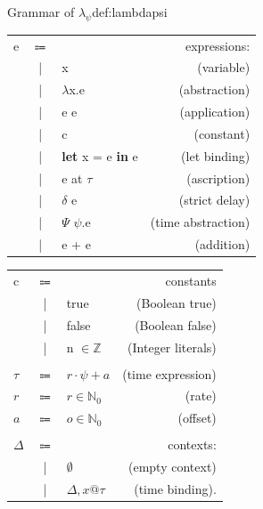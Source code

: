 \begin{definitiontitled}{Grammar of $\lambda_\psi$}{def:lambdapsi}
\begin{changemargin}{-0.5cm}{0cm}
\begin{minipage}[b]{0.50\linewidth}
\begin{tabular}{lclr}
e       & $\Coloneqq$ &                 & expressions: \\
        & |    & x                     & (variable) \\
        & |    & $\lambda$x.e          & (abstraction) \\
        & |    & e e                   & (application) \\
        & |    & c                     & (constant) \\
        & |    & \textbf{let} x = e \textbf{in} e        & (let binding) \\
        & |    & e at $\tau$           & (ascription) \\
        & |    & $\delta$ e              & (strict delay) \\
        & |    & $\Psi$ $\psi$.e          & (time abstraction) \\
        & |    & e + e                  & (addition) \\
\end{tabular}
\end{minipage}
\begin{minipage}[b]{0.40\linewidth}
\begin{tabular}{lclr}
c       & $\Coloneqq$ &                & constants \\
        & |    & true                  & (Boolean true) \\
        & |    & false                 & (Boolean false) \\
        & |    & n $\in \mathbb{Z}$    & (Integer literals) \\
\\
$\tau$  & $\Coloneqq$ & $r \cdot \psi + a$    & (time expression) \\
$r$     & $\Coloneqq$ & $r \in \mathbb{N}_0$  & (rate) \\
$a$     & $\Coloneqq$ & $o \in \mathbb{N}_0$  & (offset) \\
\\
$\Delta$& $\Coloneqq$ &                 & contexts: \\
        & |     & $\emptyset$           & (empty context) \\
        & |     & $\Delta,x@\tau$       & (time binding). \\
\end{tabular}
\end{minipage}
\end{changemargin}
\end{definitiontitled}


